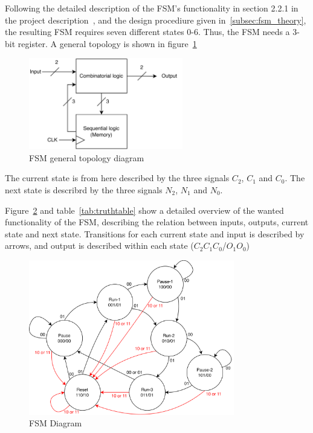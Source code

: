 Following the detailed description of the FSM's functionality in section 2.2.1 in the project description~\cite{project_description}, and the design procediure given in~\ref{subsec:fsm_theory}, the resulting FSM requires seven different states 0-6. Thus, the FSM needs a 3-bit register. A general topology is shown in figure~\ref{fig:fsm_overordnet}

\begin{figure}[H]
    \centering
    \includegraphics[width=0.6\textwidth]{Figures/FSM_overordnet.drawio.png}
    \caption{FSM general topology diagram}
    \label{fig:fsm_overordnet}
\end{figure}

The current state is from here described by the three signals $C_2$, $C_1$ and $C_0$. The next state is describrd by the three signals $N_2$, $N_1$ and $N_0$.

Figure~\ref{fig:fsm_diagram} and table~\ref{tab:truthtable} show a detailed overview of the wanted functionality of the FSM, describing the relation between inputs, outputs, current state and next state. Transitions for each current state and input is described by arrows, and output is described within each state ($C_2 C_1 C_0$/$O_1 O_0$)

\begin{figure}[H]
    \centering
    \includegraphics[width=0.8\textwidth]{Figures/FSM-diagram.png}
    \caption{FSM Diagram}
    \label{fig:fsm_diagram}
\end{figure}

